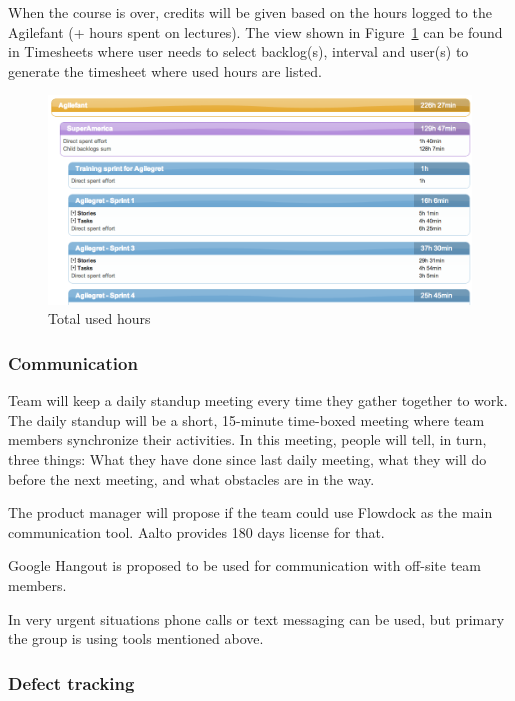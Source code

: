 When the course is over, credits will be given based on the hours logged to the 
Agilefant (+ hours spent on lectures). The view shown in 
Figure~\ref{fig:totalhours} can be found in Timesheets where user needs to 
select backlog(s), interval and user(s) to generate the timesheet where used 
hours are listed.

\begin{figure}[H]
\centering
\includegraphics[width=1\textwidth]{imgs/totalhours.png}
\caption{Total used hours}
\label{fig:totalhours}
\end{figure}

\subsubsection{Communication}

Team will keep a daily standup meeting every time they gather together to work. 
The daily standup will be a short, 15-minute time-boxed meeting where team 
members synchronize their activities. In this meeting, people will tell, in 
turn, three things: What they have done since last daily meeting, what they 
will do before the next meeting, and what obstacles are in the way.  

The product manager will propose if the team could use Flowdock as the main 
communication tool. Aalto provides 180 days license for that.

Google Hangout is proposed to be used for communication with off-site team 
members.

In very urgent situations phone calls or text messaging can be used, but primary the group is using tools mentioned above.

\subsubsection{Defect tracking}

